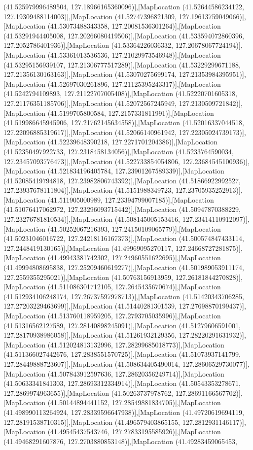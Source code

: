 (41.525979996489504, 127.18966165360096)],[MapLocation (41.52644586234122, 127.19309488114003)],[MapLocation (41.52747396821309, 127.19613759049066)],[MapLocation (41.53073488343358, 127.20081536301264)],[MapLocation (41.53291944405008, 127.20266080419506)],[MapLocation (41.533594072860396, 127.2052786401936)],[MapLocation (41.53364226036332, 127.20678067724194)],[MapLocation (41.53361013536536, 127.21029973546948)],[MapLocation (41.53295156939107, 127.21306777517289)],[MapLocation (41.53229299671188, 127.21356130163163)],[MapLocation (41.53070275699174, 127.21353984395951)],[MapLocation (41.52697030261896, 127.21125395243317)],[MapLocation (41.5242794109893, 127.21122707005408)],[MapLocation (41.52220701605318, 127.21176351185706)],[MapLocation (41.52072567245949, 127.2130509721842)],[MapLocation (41.5199705800584, 127.2157331811991)],[MapLocation (41.519986645945906, 127.21762145634558)],[MapLocation (41.52016337044518, 127.22096885319617)],[MapLocation (41.52066140961942, 127.22305024739173)],[MapLocation (41.52239648390218, 127.2271701204386)],[MapLocation (41.52350497922733, 127.2318458134056)],[MapLocation (41.5233764590034, 127.23457093776473)],[MapLocation (41.522733854054806, 127.23684545100936)],[MapLocation (41.521834196405784, 127.23901267589339)],[MapLocation (41.52085419794818, 127.23982806743392)],[MapLocation (41.51866922992527, 127.23937678111804)],[MapLocation (41.5151988349723, 127.23705935252913)],[MapLocation (41.511905000989, 127.23394799007185)],[MapLocation (41.51076417062972, 127.23296093715442)],[MapLocation (41.50947870388229, 127.23276781810534)],[MapLocation (41.508145005153416, 127.23414110912097)],[MapLocation (41.50252067216393, 127.24150109065779)],[MapLocation (41.50231046016722, 127.24218116167373)],[MapLocation (41.500574847433114, 127.2448419130165)],[MapLocation (41.49969095270117, 127.24668727281875)],[MapLocation (41.49943381742302, 127.24960551622695)],[MapLocation (41.49994808695838, 127.25209460619277)],[MapLocation (41.501989053911174, 127.2559355295021)],[MapLocation (41.50763156913959, 127.26181844270828)],[MapLocation (41.511086301712105, 127.2645435670674)],[MapLocation (41.512934106248174, 127.26737597978713)],[MapLocation (41.51420343706285, 127.27203229463699)],[MapLocation (41.51440281301539, 127.27698870199437)],[MapLocation (41.513760118959205, 127.2793705035996)],[MapLocation (41.51316562127589, 127.28140898245091)],[MapLocation (41.51279606591001, 127.28170938986058)],[MapLocation (41.51261932129356, 127.28220291631932)],[MapLocation (41.512024813132996, 127.28299685018773)],[MapLocation (41.511366027442676, 127.2838551570725)],[MapLocation (41.51073937141799, 127.28449888723607)],[MapLocation (41.508634405490014, 127.28606529730077)],[MapLocation (41.507843912597636, 127.28620356249714)],[MapLocation (41.50633341841303, 127.28693312334914)],[MapLocation (41.50543353278671, 127.2869974963655)],[MapLocation (41.50263737978762, 127.28691166567702)],[MapLocation (41.50144894441152, 127.28549881834705)],[MapLocation (41.498990113264924, 127.28339596647938)],[MapLocation (41.49720619694119, 127.28191538710315)],[MapLocation (41.496579403865155, 127.2812931146117)],[MapLocation (41.49545437543746, 127.27833195585926)],[MapLocation (41.49468291607876, 127.2703880853148)],[MapLocation (41.49283459065453, 